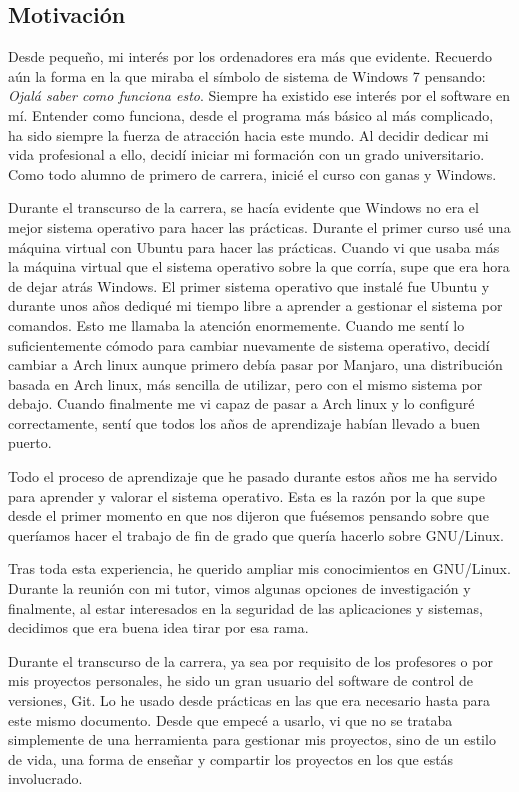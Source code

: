 \documentclass[titlepage, 12pt, a4paper]{article}
\begin{document}
\subsection{Motivación}
Desde pequeño, mi interés por los ordenadores era más que evidente. Recuerdo aún la forma en la que miraba el símbolo de sistema de Windows 7 pensando: \textit{Ojalá saber como funciona esto}. Siempre ha existido ese interés por el software en mí. Entender como funciona, desde el programa más básico al más complicado, ha sido siempre la fuerza de atracción hacia este mundo. Al decidir dedicar mi vida profesional a ello, decidí iniciar mi formación con un grado universitario.
Como todo alumno de primero de carrera, inicié el curso con ganas y Windows.\par
Durante el transcurso de la carrera, se hacía evidente que Windows no era el mejor sistema operativo para hacer las prácticas. Durante el primer curso usé una máquina virtual con \gls{Ubuntu} para hacer las prácticas. Cuando vi que usaba más la máquina virtual que el sistema operativo sobre la que corría, supe que era hora de dejar atrás Windows. El primer sistema operativo que instalé fue \gls{Ubuntu} y durante unos años dediqué mi tiempo libre a aprender a gestionar el sistema por comandos. Esto me llamaba la atención enormemente. Cuando me sentí lo suficientemente cómodo para cambiar nuevamente de sistema operativo, decidí cambiar a \gls{Arch linux} aunque primero debía pasar por \gls{Manjaro}, una distribución basada en \gls{Arch linux}, más sencilla de utilizar, pero con el mismo sistema por debajo. Cuando finalmente me vi capaz de pasar a \gls{Arch linux} y lo configuré correctamente, sentí que todos los años de aprendizaje habían llevado a buen puerto. \par
Todo el proceso de aprendizaje que he pasado durante estos años me ha servido para aprender y valorar el sistema operativo. Esta es la razón por la que supe desde el primer momento en que nos dijeron que fuésemos pensando sobre que queríamos hacer el trabajo de fin de grado que quería hacerlo sobre \gls{GNU/Linux}.\par
Tras toda esta experiencia, he querido ampliar mis conocimientos en \gls{GNU/Linux}. Durante la reunión con mi tutor, vimos algunas opciones de investigación y finalmente, al estar interesados en la seguridad de las aplicaciones y sistemas, decidimos que era buena idea tirar por esa rama.\par
Durante el transcurso de la carrera, ya sea por requisito de los profesores o por mis proyectos personales, he sido un gran usuario del software de control de versiones, \gls{Git}. Lo he usado desde prácticas en las que era necesario hasta para este mismo documento. Desde que empecé a usarlo, vi que no se trataba simplemente de una herramienta para gestionar mis proyectos, sino de un estilo de vida, una forma de enseñar y compartir los proyectos en los que estás involucrado.\par
\end{document}
